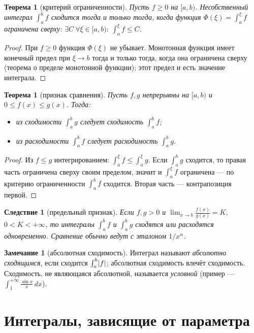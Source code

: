 \documentclass[11pt,a4paper]{article}
\theoremstyle{definition}
\newtheorem{remark}[definition]{Замечание}
\theoremstyle{plain}
\newtheorem{theorem}[definition]{Теорема}
\newtheorem{corollary}[definition]{Следствие}
\newcommand{\dx}{\,dx}
\renewcommand{\le}{\leqslant}
\renewcommand{\ge}{\geqslant}
\DeclarePairedDelimiter{\abs}{\lvert}{\rvert}
\begin{document}
\begin{theorem}[критерий ограниченности]
Пусть $f\ge0$ на $[a,b)$. Несобственный интеграл $\int_a^b f$ сходится тогда и только тогда, когда
функция $\Phi(\xi)=\int_a^\xi f$ ограничена сверху:
$\exists C\ \forall\xi\in[a,b):\ \int_a^\xi f\le C$.
\end{theorem}

\begin{proof}
При $f\ge0$ функция $\Phi(\xi)$ не убывает. Монотонная функция имеет конечный предел при
$\xi\to b$ тогда и только тогда, когда она ограничена сверху (теорема о пределе монотонной
функции); этот предел и есть значение интеграла.
\end{proof}

\begin{theorem}[признак сравнения]
Пусть $f,g$ непрерывны на $[a,b)$ и $0\le f(x)\le g(x)$. Тогда:
\begin{itemize}[leftmargin=*]
  \item из сходимости $\int_a^b g$ следует сходимость $\int_a^b f$;
  \item из расходимости $\int_a^b f$ следует расходимость $\int_a^b g$.
\end{itemize}
\end{theorem}

\begin{proof}
Из $f\le g$ интегрированием: $\int_a^\xi f\le\int_a^\xi g$. Если $\int_a^b g$ сходится, то правая
часть ограничена сверху своим пределом, значит и $\int_a^\xi f$ ограничена — по критерию
ограниченности $\int_a^b f$ сходится. Вторая часть — контрапозиция первой.
\end{proof}

\begin{corollary}[предельный признак]
Если $f,g>0$ и $\displaystyle\lim_{x\to b}\frac{f(x)}{g(x)}=K$, $0<K<+\infty$, то интегралы
$\int_a^b f$ и $\int_a^b g$ сходятся или расходятся одновременно. Сравнение обычно ведут с
эталоном $1/x^\alpha$.
\end{corollary}

\begin{remark}[абсолютная сходимость]
Интеграл называют \emph{абсолютно сходящимся}, если сходится $\int_a^b\abs f$; абсолютная
сходимость влечёт сходимость. Сходимость, не являющаяся абсолютной, называется \emph{условной}
(пример — $\int_1^{+\infty}\frac{\sin x}{x}\dx$).
\end{remark}

\section{Интегралы, зависящие от параметра}
\end{document}
